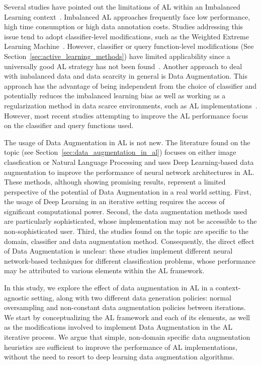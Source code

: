 \documentclass[parskip=full]{scrartcl}
\begin{document}
Several studies have pointed out the limitations of AL within an Imbalanced
Learning context~\cite{Yu2019}. Imbalanced AL approaches frequently face low
performance, high time consumption or high data annotation costs. Studies
addressing this issue tend to adopt classifier-level modifications, such as
the Weighted Extreme Learning Machine~\cite{Zong2013, Yu2019}. However,
classifier or query function-level modifications (See
Section~\ref{sec:active_learning_methods}) have limited applicability since a
universally good AL strategy has not been found~\cite{Sener2018}. Another
approach to deal with imbalanced data and data scarcity in general is Data
Augmentation. This approach has the advantage of being independent from the
choice of classifier and potentially reduces the imbalanced learning bias as
well as working as a regularization method in data scarce environments, such
as AL implementations~\cite{Kim2021}. However, most recent studies attempting
to improve the AL performance focus on the classifier and query functions
used.

The usage of Data Augmentation in AL is not new. The literature found on the
topic (see Section~\ref{sec:data_augmentation_in_al}) focuses on either image
classfication or Natural Language Processing and uses Deep Learning-based data
augmentation to improve the performance of neural network architectures in
AL\@. These methods, although showing promising results, represent a limited
perspective of the potential of Data Augmentation in a real world setting.
First, the usage of Deep Learning in an iterative setting requires the access
of significant computational power. Second, the data augmentation methods used
are particularly sophisticated, whose implementation may not be accessible to
the non-sophisticated user. Third, the studies found on the topic are specific
to the domain, classifier and data augmentation method. Consequently, the
direct effect of Data Augmentation is unclear: these studies implement
different neural network-based techniques for different classification
problems, whose performance may be attributed to various elements within the
AL framework.

In this study, we explore the effect of data augmentation in AL in a
context-agnostic setting, along with two different data generation policies:
normal oversampling and non-constant data augmentation policies between
iterations. We start by conceptualizing the AL framework and each of its
elements, as well as the modifications involved to implement Data Augmentation
in the AL iterative process. We argue that simple, non-domain specific data
augmentation heuristics are sufficient to improve the performance of AL
implementations, without the need to resort to deep learning data augmentation
algorithms.
\end{document}
